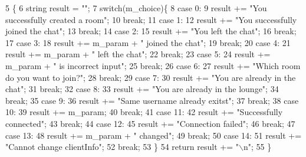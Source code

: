\begin{DoxyCode}
5                                                             \{
6     \textcolor{keywordtype}{string} result = \textcolor{stringliteral}{""};
7     \textcolor{keywordflow}{switch}(m\_choice)\{
8         \textcolor{keywordflow}{case} 0:
9             result += \textcolor{stringliteral}{"You successfully created a room"};
10             \textcolor{keywordflow}{break};
11         \textcolor{keywordflow}{case} 1:
12             result += \textcolor{stringliteral}{"You successfully joined the chat"};
13             \textcolor{keywordflow}{break};
14         \textcolor{keywordflow}{case} 2:
15             result += \textcolor{stringliteral}{"You left the chat"};
16             \textcolor{keywordflow}{break};
17         \textcolor{keywordflow}{case} 3:
18             result += m\_param + \textcolor{stringliteral}{" joined the chat"};
19             \textcolor{keywordflow}{break};
20         \textcolor{keywordflow}{case} 4:
21             result += m\_param + \textcolor{stringliteral}{" left the chat"};
22             \textcolor{keywordflow}{break};
23         \textcolor{keywordflow}{case} 5:
24             result += m\_param + \textcolor{stringliteral}{" is incorrect input"};
25             \textcolor{keywordflow}{break};
26         \textcolor{keywordflow}{case} 6:
27             result += \textcolor{stringliteral}{"Which room do you want to join?"};
28             \textcolor{keywordflow}{break};
29         \textcolor{keywordflow}{case} 7:
30             result += \textcolor{stringliteral}{"You are already in the chat"};
31             \textcolor{keywordflow}{break};
32         \textcolor{keywordflow}{case} 8:
33             result += \textcolor{stringliteral}{"You are already in the lounge"};
34             \textcolor{keywordflow}{break};
35         \textcolor{keywordflow}{case} 9:
36             result += \textcolor{stringliteral}{"Same username already exitst"};
37             \textcolor{keywordflow}{break};
38         \textcolor{keywordflow}{case} 10:
39             result += m\_param;
40             \textcolor{keywordflow}{break};
41         \textcolor{keywordflow}{case} 11:
42             result += \textcolor{stringliteral}{"Successfully connected"};
43             \textcolor{keywordflow}{break};
44         \textcolor{keywordflow}{case} 12:
45             result += \textcolor{stringliteral}{"Connection failed"};
46             \textcolor{keywordflow}{break};
47         \textcolor{keywordflow}{case} 13:
48             result += m\_param + \textcolor{stringliteral}{" changed"};
49             \textcolor{keywordflow}{break};
50         \textcolor{keywordflow}{case} 14:
51             result += \textcolor{stringliteral}{"Cannot change clientInfo"};
52             \textcolor{keywordflow}{break};
53     \} 
54     \textcolor{keywordflow}{return} result += \textcolor{stringliteral}{"\(\backslash\)n"};
55 \}
\end{DoxyCode}
